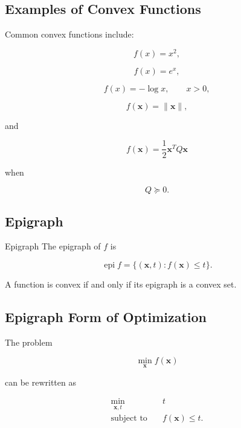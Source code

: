 \subsection{Examples of Convex Functions}
\label{subsec:examples-convex-functions}

Common convex functions include:

\[
\boxed{
f(x)=x^2,
}
\]

\[
\boxed{
f(x)=e^x,
}
\]

\[
\boxed{
f(x)=-\log x,
\qquad
x>0,
}
\]

\[
\boxed{
f(\mathbf{x})=\|\mathbf{x}\|,
}
\]

and

\[
\boxed{
f(\mathbf{x})
=
\frac12
\mathbf{x}^TQ\mathbf{x}
}
\]

when

\[
Q\succeq0.
\]

\subsection{Epigraph}
\label{subsec:epigraph}

\begin{definitionbox}{Epigraph}
The epigraph of \(f\) is

\[
\boxed{
\operatorname{epi}f
=
\{
(\mathbf{x},t):
f(\mathbf{x})\leq t
\}.
}
\]
\end{definitionbox}

A function is convex if and only if its epigraph is a convex set.

\subsection{Epigraph Form of Optimization}
\label{subsec:epigraph-form-optimization}

The problem

\[
\min_{\mathbf{x}}
f(\mathbf{x})
\]

can be rewritten as

\[
\boxed{
\begin{aligned}
\min_{\mathbf{x},t}
\quad&
t
\\
\text{subject to}
\quad&
f(\mathbf{x})\leq t.
\end{aligned}
}
\]

